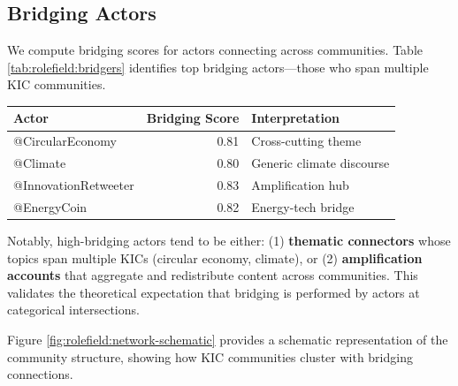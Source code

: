 \documentclass[../main.tex]{subfiles}
\begin{document}
\subsection{Bridging Actors}

We compute bridging scores for actors connecting across communities. Table \ref{tab:rolefield:bridgers} identifies top bridging actors---those who span multiple KIC communities.

\begin{center}
\small
\begin{tabular}{lrl}
\toprule
\textbf{Actor} & \textbf{Bridging Score} & \textbf{Interpretation} \\
\midrule
@CircularEconomy & 0.81 & Cross-cutting theme \\
@Climate & 0.80 & Generic climate discourse \\
@InnovationRetweeter & 0.83 & Amplification hub \\
@EnergyCoin & 0.82 & Energy-tech bridge \\
\bottomrule
\end{tabular}
\end{center}

Notably, high-bridging actors tend to be either: (1) \textbf{thematic connectors} whose topics span multiple KICs (circular economy, climate), or (2) \textbf{amplification accounts} that aggregate and redistribute content across communities. This validates the theoretical expectation that bridging is performed by actors at categorical intersections.

Figure \ref{fig:rolefield:network-schematic} provides a schematic representation of the community structure, showing how KIC communities cluster with bridging connections.
\end{document}
